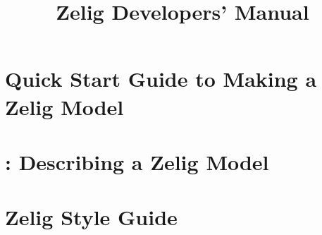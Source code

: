 \documentclass{book}
\title{Zelig Developers' Manual \code{v1.0}}
\begin{document}
\maketitle


\tableofcontents


\chapter[Quick Start Guide]{Quick Start Guide to Making a Zelig Model}
\label{chapter:quickstart}



% 


\chapter[\code{describe}]{: Describing a Zelig Model}
\label{chapter:describe}



\chapter[\code{zelig2}]{}
\label{chapter:zelig2}



\chapter[\code{param}]{}
\label{chapter:param}



\chapter[\code{qi}]{}
\label{chapter:qi}



\chapter[Zelig Style Guide]{Zelig Style Guide}
\label{chapter:styleguide}

\end{document}
